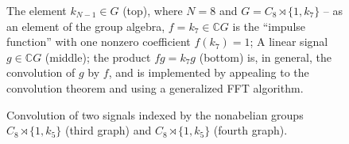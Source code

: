 \documentclass[reqno,onecolumn,oneside]{paper}
\newcommand{\<}{\ensuremath{\langle}}
\renewcommand{\>}{\ensuremath{\rangle}}
\newcommand{\sdp}{\ensuremath{\rtimes}}
\newcommand{\field}[1]{\ensuremath{\mathbb{#1}}}
\newcommand{\C}{\field{C}}                   %
\newcommand{\ga}[1]{\ensuremath{\C #1}} %
\newcommand{\CG}{\ga{G}}                %
\begin{document}
\begin{center}
  
\begin{figure}
\caption{The element $k_{N-1} \in G$ (top), where $N=8$ and $G = C_{8}\sdp \{1,k_7\}$ -- as an element of the group
  algebra, $f =  k_7 \in \CG$ is the ``impulse 
    function'' with one nonzero coefficient $f(k_7) =1$; 
    A linear signal $g\in \CG$ (middle); the product $fg = k_7g$ (bottom) is,
    in general, the convolution of $g$ by $f$, and is implemented
    by appealing to the convolution theorem and using a 
    generalized FFT algorithm.}
\label{fig:k7conv}
\end{figure}
\begin{figure}
\caption{Convolution of two signals indexed by the nonabelian
  groups $C_{8}\sdp \{1,k_5\}$ (third graph) and 
  $C_{8}\sdp \{1,k_5\}$ (fourth graph).}
\label{fig:k5_k3_conv}
\end{figure}

\end{center}
\end{document}

